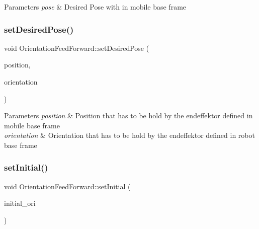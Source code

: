 \begin{DoxyParams}{Parameters}
{\em pose} & Desired Pose with in mobile base frame \\
\hline
\end{DoxyParams}
\mbox{\label{classOrientationFeedForward_ad419aebf0df88282ca6c1dc24adbadb2}} 
\subsubsection{\texorpdfstring{set\+Desired\+Pose()}{setDesiredPose()}\hspace{0.1cm}{\footnotesize\ttfamily [2/2]}}
{\footnotesize\ttfamily void Orientation\+Feed\+Forward\+::set\+Desired\+Pose (\begin{DoxyParamCaption}\item[{Position}]{position,  }\item[{Orientation}]{orientation }\end{DoxyParamCaption})}


\begin{DoxyParams}{Parameters}
{\em position} & Position that has to be hold by the endeffektor defined in mobile base frame \\
\hline
{\em orientation} & Orientation that has to be hold by the endeffektor defined in robot base frame \\
\hline
\end{DoxyParams}
\mbox{\label{classOrientationFeedForward_a28382586a5d371fa6efbdf08f5e57518}} 
\subsubsection{\texorpdfstring{set\+Initial()}{setInitial()}}
{\footnotesize\ttfamily void Orientation\+Feed\+Forward\+::set\+Initial (\begin{DoxyParamCaption}\item[{Orientation}]{initial\+\_\+ori }\end{DoxyParamCaption})}


